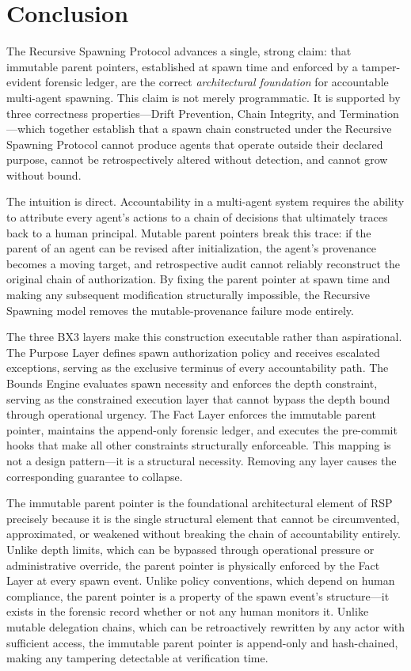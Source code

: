 \section{Conclusion}
\label{sec:conclusion}

The Recursive Spawning Protocol advances a single, strong claim: that immutable parent pointers, established at spawn time and enforced by a tamper-evident forensic ledger, are the correct \emph{architectural foundation} for accountable multi-agent spawning. This claim is not merely programmatic. It is supported by three correctness properties---Drift Prevention, Chain Integrity, and Termination---which together establish that a spawn chain constructed under the Recursive Spawning Protocol cannot produce agents that operate outside their declared purpose, cannot be retrospectively altered without detection, and cannot grow without bound.

The intuition is direct. Accountability in a multi-agent system requires the ability to attribute every agent's actions to a chain of decisions that ultimately traces back to a human principal. Mutable parent pointers break this trace: if the parent of an agent can be revised after initialization, the agent's provenance becomes a moving target, and retrospective audit cannot reliably reconstruct the original chain of authorization. By fixing the parent pointer at spawn time and making any subsequent modification structurally impossible, the Recursive Spawning model removes the mutable-provenance failure mode entirely.

The three BX3 layers make this construction executable rather than aspirational. The Purpose Layer defines spawn authorization policy and receives escalated exceptions, serving as the exclusive terminus of every accountability path. The Bounds Engine evaluates spawn necessity and enforces the depth constraint, serving as the constrained execution layer that cannot bypass the depth bound through operational urgency. The Fact Layer enforces the immutable parent pointer, maintains the append-only forensic ledger, and executes the pre-commit hooks that make all other constraints structurally enforceable. This mapping is not a design pattern---it is a structural necessity. Removing any layer causes the corresponding guarantee to collapse.

The immutable parent pointer is the foundational architectural element of RSP precisely because it is the single structural element that cannot be circumvented, approximated, or weakened without breaking the chain of accountability entirely. Unlike depth limits, which can be bypassed through operational pressure or administrative override, the parent pointer is physically enforced by the Fact Layer at every spawn event. Unlike policy conventions, which depend on human compliance, the parent pointer is a property of the spawn event's structure---it exists in the forensic record whether or not any human monitors it. Unlike mutable delegation chains, which can be retroactively rewritten by any actor with sufficient access, the immutable parent pointer is append-only and hash-chained, making any tampering detectable at verification time.

